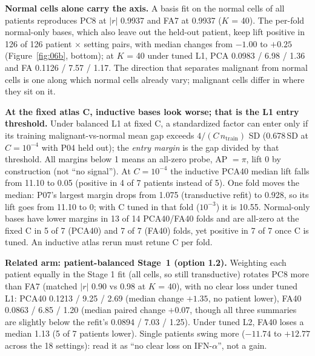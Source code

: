 \textbf{Normal cells alone carry the axis.} A basis fit on the normal cells of all patients reproduces PC8 at $|r|$ 0.9937 and FA7 at 0.9937 ($K$ = 40). The per-fold normal-only bases, which also leave out the held-out patient, keep lift positive in 126 of 126 patient $\times$ setting pairs, with median changes from $-1.00$ to $+0.25$\pp{} (Figure~\ref{fig:06b}, bottom); at $K$ = 40 under tuned L1, PCA 0.0983 / 6.98 / 1.36\pp{} and FA 0.1126 / 7.57 / 1.17\pp. The direction that separates malignant from normal cells is one along which normal cells already vary; malignant cells differ in where they sit on it.

\textbf{At the fixed atlas C, inductive bases look worse; that is the L1 entry threshold.} Under balanced L1 at fixed C, a standardized factor can enter only if its training malignant-vs-normal mean gap exceeds $4/(C\,n_{\text{train}})$ SD (0.678\,SD at $C = 10^{-4}$ with P04 held out); the \emph{entry margin} is the gap divided by that threshold. All margins below 1 means an all-zero probe, AP $= \pi$, lift 0 by construction (not ``no signal''). At $C = 10^{-4}$ the inductive PCA40 median lift falls from 11.10 to 0.05\pp{} (positive in 4 of 7 patients instead of 5). One fold moves the median: P07's largest margin drops from 1.075 (transductive refit) to 0.928, so its lift goes from 11.10\pp{} to 0; with C tuned in that fold ($10^{-3}$) it is 10.55\pp. Normal-only bases have lower margins in 13 of 14 PCA40/FA40 folds and are all-zero at the fixed C in 5 of 7 (PCA40) and 7 of 7 (FA40) folds, yet positive in 7 of 7 once C is tuned. An inductive atlas rerun must retune C per fold.

\textbf{Related arm: patient-balanced Stage~1 (option 1.2).} Weighting each patient equally in the Stage 1 fit (all cells, so still transductive) rotates PC8 more than FA7 (matched $|r|$ 0.90 vs 0.98 at $K$ = 40), with no clear loss under tuned L1: PCA40 0.1213 / 9.25 / 2.69\pp{} (median change $+1.35$\pp, no patient lower), FA40 0.0863 / 6.85 / 1.20\pp{} (median paired change $+0.07$\pp, though all three summaries are slightly below the refit's 0.0894 / 7.03 / 1.25). Under tuned L2, FA40 loses a median 1.13\pp{} (5 of 7 patients lower). Single patients swing more ($-11.74$ to $+12.77$\pp{} across the 18 settings): read it as ``no clear loss on IFN-$\alpha$'', not a gain.

